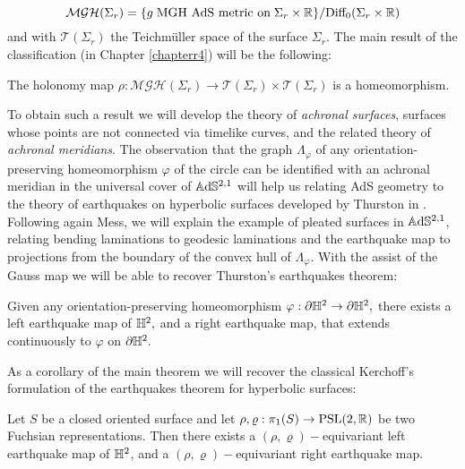 \[
    \mathcal{MGH}(\Sigma_r)=\{g\;\text{MGH AdS metric on}\;\Sigma_r\times\mathbb{R}\}/\text{Diff}_0(\Sigma_r\times\mathbb{R})
\] and with $\mathcal{T}(\Sigma_r)$ the Teichmüller space of the surface $\Sigma_r.$ The main result of the classification (in Chapter \ref{chapterr4}) will be the following: 

\begin{theorem}
    The holonomy map $\rho:\mathcal{MGH}(\Sigma_r)\to\mathcal{T}(\Sigma_r)\times\mathcal{T}(\Sigma_r)$ is a homeomorphism.
\end{theorem}

To obtain such a result we will develop the theory of \textit{achronal surfaces}, surfaces whose points are not connected via timelike curves, and the related theory of \textit{achronal meridians}. The observation that the graph $\Lambda_\varphi$ of any orientation-preserving homeomorphism $\varphi$ of the circle can be identified with an achronal meridian in the universal cover of $\mathbb{A}\mathrm{d}\mathbb{S}^{2,1}$ will help us relating AdS geometry to the theory of earthquakes on hyperbolic surfaces developed by Thurston in \cite{thurston1986earthquakes}.\\ 

Following again Mess, we will explain the example of pleated surfaces in $\mathbb{A}\mathrm{d}\mathbb{S}^{2,1}$, relating bending laminations to geodesic laminations and the earthquake map to projections from the boundary of the convex hull of $\Lambda_\varphi$. With the assist of the Gauss map we will be able to recover Thurston's earthquakes theorem: 

\begin{theorem}
    Given any orientation-preserving homeomorphism $\varphi:\partial\mathbb{H}^2\to\partial\mathbb{H}^2,$ there exists a left earthquake map of $\mathbb{H}^2,$ and a right earthquake map, that extends continuously to $\varphi$ on $\partial\mathbb{H}^2.$
\end{theorem}

\noindent As a corollary of the main theorem we will recover the classical Kerchoff's formulation of the earthquakes theorem for hyperbolic surfaces: 

\begin{corollary}
    Let $S$ be a closed oriented surface and let $\rho,\varrho:\pi_1(S)\to\text{PSL}(2,\mathbb{R})$ be two Fuchsian representations. Then there exists a $(\rho,\varrho)-$equivariant left earthquake map of $\mathbb{H}^2$, and a $(\rho,\varrho)-$equivariant right earthquake map. 
\end{corollary}